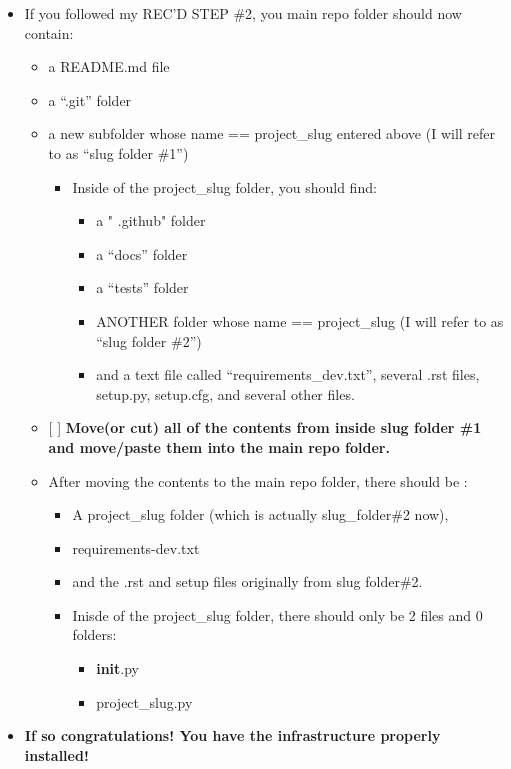 \documentclass[11pt]{article}
\providecommand{\tightlist}{%
      \setlength{\itemsep}{0pt}\setlength{\parskip}{0pt}}
\begin{document}
\begin{itemize}
\tightlist
\item
  If you followed my REC'D STEP \#2, you main repo folder should now
  contain:

  \begin{itemize}
  \item
    a README.md file
  \item
    a ``.git'' folder
  \item
    a new subfolder whose name == project\_slug entered above (I will
    refer to as ``slug folder \#1'')

    \begin{itemize}
    \tightlist
    \item
      Inside of the project\_slug folder, you should find:

      \begin{itemize}
      \tightlist
      \item
        a " .github" folder
      \item
        a ``docs'' folder
      \item
        a ``tests'' folder
      \item
        ANOTHER folder whose name == project\_slug (I will refer to as
        ``slug folder \#2'')
      \item
        and a text file called ``requirements\_dev.txt'', several .rst
        files, setup.py, setup.cfg, and several other files.
      \end{itemize}
    \end{itemize}
  \item
    {[} {]} \textbf{Move(or cut) all of the contents from inside slug
    folder \#1 and move/paste them into the main repo folder.}
  \item
    After moving the contents to the main repo folder, there should be :

    \begin{itemize}
    \item
      A project\_slug folder (which is actually slug\_folder\#2 now),
    \item
      requirements-dev.txt
    \item
      and the .rst and setup files originally from slug folder\#2.
    \item
      Inisde of the project\_slug folder, there should only be 2 files
      and 0 folders:

      \begin{itemize}
      \tightlist
      \item
        \textbf{init}.py
      \item
        project\_slug.py
      \end{itemize}
    \end{itemize}
  \end{itemize}
\item
  \textbf{If so congratulations! You have the infrastructure properly
  installed!}
\end{itemize}
\end{document}
